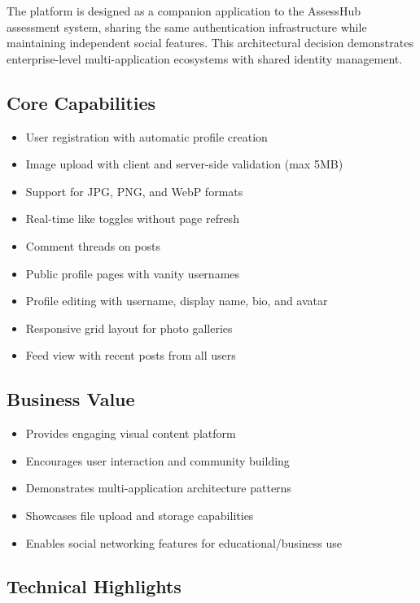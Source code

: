 \documentclass[12pt,a4paper]{report}
\begin{document}
The platform is designed as a companion application to the AssessHub assessment system, sharing the same authentication infrastructure while maintaining independent social features. This architectural decision demonstrates enterprise-level multi-application ecosystems with shared identity management.

\subsection{Core Capabilities}

\begin{itemize}
    \item User registration with automatic profile creation
    \item Image upload with client and server-side validation (max 5MB)
    \item Support for JPG, PNG, and WebP formats
    \item Real-time like toggles without page refresh
    \item Comment threads on posts
    \item Public profile pages with vanity usernames
    \item Profile editing with username, display name, bio, and avatar
    \item Responsive grid layout for photo galleries
    \item Feed view with recent posts from all users
\end{itemize}

\subsection{Business Value}

\begin{itemize}
    \item Provides engaging visual content platform
    \item Encourages user interaction and community building
    \item Demonstrates multi-application architecture patterns
    \item Showcases file upload and storage capabilities
    \item Enables social networking features for educational/business use
\end{itemize}

\subsection{Technical Highlights}
\end{document}
